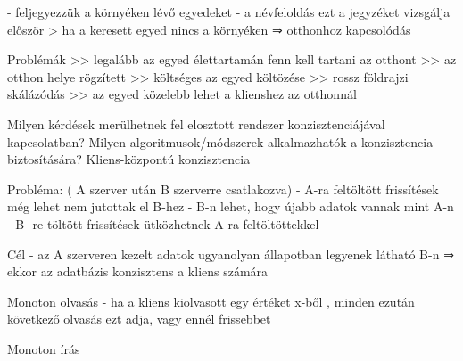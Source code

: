 \documentclass[twoside, a4paper, 12pt]{article}
\begin{document}
\begin{description}
                                                                        - feljegyezzük a környéken lévő egyedeket
                                                                        - a névfeloldás ezt a jegyzéket vizsgálja először
                                                                        > ha a keresett egyed nincs a környéken ⇒ otthonhoz kapcsolódás
                                                                    \item Problémák
                                                                        >> legalább az egyed élettartamán fenn kell tartani az otthont
                                                                        >> az otthon helye rögzített >> költséges az egyed költözése
                                                                        >> rossz földrajzi skálázódás
                                                                        >> az egyed közelebb lehet a klienshez az otthonnál
                                                                    \item  Milyen kérdések merülhetnek fel elosztott rendszer konzisztenciájával kapcsolatban? Milyen algoritmusok/módszerek alkalmazhatók a konzisztencia biztosítására? 
                                                                        Kliens-központú konzisztencia
                                                                    \item Probléma: ( A szerver után B szerverre csatlakozva)
                                                                        - A-ra feltöltött frissítések még lehet nem jutottak el B-hez
                                                                        - B-n lehet, hogy újabb adatok vannak mint A-n
                                                                        - B -re töltött frissítések ütközhetnek A-ra feltöltöttekkel
                                                                    \item Cél
                                                                        - az A szerveren kezelt adatok ugyanolyan állapotban legyenek látható B-n ⇒ ekkor az adatbázis konzisztens a kliens számára
                                                                    \item Monoton olvasás
                                                                        - ha a kliens kiolvasott egy értéket x-ből , minden ezután következő olvasás ezt adja, vagy ennél frissebbet
                                                                    \item Monoton írás

\end{description}
\end{document}
